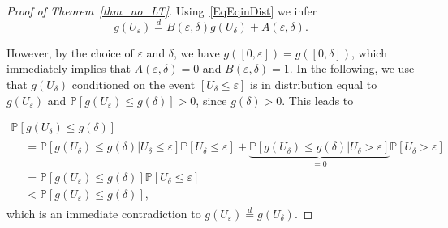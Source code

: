\documentclass[AHL,Unicode,longabstracts,published]{cedram}
\newcommand{\bbP}{\mathbb{P}}
\begin{document}
\begin{proof}[Proof of Theorem~\ref{thm_no_LT}]
Using~\eqref{EqEqinDist} we infer
\begin{equation*}
g(U_{\varepsilon}) \stackrel{d}{=} B(\varepsilon, \delta) g(U_{\delta}) + A(\varepsilon, \delta).
\end{equation*}

However, by the choice of $\varepsilon$ and $\delta$, we have $g([0, \varepsilon]) = g([0, \delta])$, which immediately implies that $A(\varepsilon, \delta)=0$ and $B(\varepsilon, \delta)=1$. In the following, we use that $g(U_{\delta})$ conditioned on the event $ \left[U_{\delta} \leq \varepsilon \right] $ is in distribution equal to $ g(U_{\varepsilon}) $ and $\bbP \left[g(U_{\varepsilon}) \leq g(\delta) \right] > 0$, since $g(\delta)>0$. This leads to

\begin{multline*}
\bbP\left[g(U_{\delta}) \leq g(\delta)\right]
\\
\begin{aligned}
&= \bbP\left[g(U_{\delta}) \leq g(\delta) | U_{\delta} \leq \varepsilon \right] \bbP \left[U_{\delta} \leq \varepsilon \right] + \underbrace{\bbP\left[g(U_{\delta}) \leq g(\delta) | U_{\delta} > \varepsilon \right]}_{=0} \bbP \left[U_{\delta} > \varepsilon \right] \\
&=\bbP \left[g(U_{\varepsilon}) \leq g(\delta) \right] \bbP \left[U_{\delta} \leq \varepsilon \right] \\
&<\bbP \left[g(U_{\varepsilon}) \leq g(\delta) \right],
\end{aligned}
\end{multline*}
which is an immediate contradiction to $g(U_\varepsilon) \stackrel{d}{=} g(U_\delta)$.
\end{proof}




\end{document}

